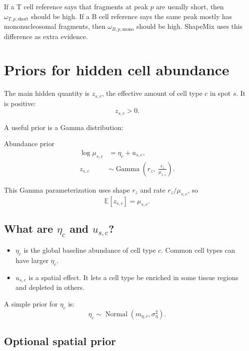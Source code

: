 \documentclass[11pt]{article}
\newcommand{\Gam}{\operatorname{Gamma}}
\newcommand{\Normal}{\operatorname{Normal}}
\newcommand{\E}{\mathbb{E}}
\begin{document}
\begin{bio}
If a T cell reference says that fragments at peak \(p\) are usually short, then \(\omega_{T,p,\mathrm{short}}\) should be high.  If a B cell reference says the same peak mostly has mononucleosomal fragments, then \(\omega_{B,p,\mathrm{mono}}\) should be high.  ShapeMix uses this difference as extra evidence.
\end{bio}

\section{Priors for hidden cell abundance}

The main hidden quantity is \(z_{s,c}\), the effective amount of cell type \(c\) in spot \(s\).  It is positive:
\[
z_{s,c} > 0.
\]

A useful prior is a Gamma distribution:

\begin{mathbox}{Abundance prior}
\begin{align}
\log \mu_{s,c} &= \eta_c + u_{s,c}, \label{eq:meanabundance}\\
z_{s,c} &\sim \Gam\left(r_z,\; \frac{r_z}{\mu_{s,c}}\right). \label{eq:zprior}
\end{align}
\end{mathbox}

This Gamma parameterization uses shape \(r_z\) and rate \(r_z/\mu_{s,c}\), so
\[
\E[z_{s,c}]=\mu_{s,c}.
\]

\subsection{What are \texorpdfstring{\(\eta_c\)}{eta} and \texorpdfstring{\(u_{s,c}\)}{u}?}

\begin{itemize}[leftmargin=2em]
    \item \(\eta_c\) is the global baseline abundance of cell type \(c\).  Common cell types can have larger \(\eta_c\).
    \item \(u_{s,c}\) is a spatial effect.  It lets a cell type be enriched in some tissue regions and depleted in others.
\end{itemize}

A simple prior for \(\eta_c\) is:
\[
\eta_c \sim \Normal(m_{\eta,c},\sigma_{\eta}^{2}).
\]

\subsection{Optional spatial prior}
\end{document}
